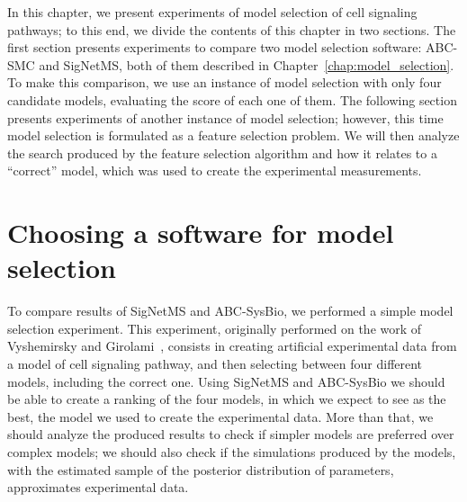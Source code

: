 
In this chapter, we present experiments of model selection of cell
signaling pathways; to this end, we divide the contents of this chapter in two 
sections. The first section presents experiments to compare two model 
selection software: ABC-SMC and SigNetMS, both of them described in 
Chapter~\ref{chap:model_selection}. To make this comparison, we
use an instance of model selection with only four candidate models,
evaluating the score of each one of them. The following section presents
experiments of another instance of model selection; however, this time
model selection is formulated as a feature selection problem. We will then analyze the
search produced by the feature selection algorithm and how it relates to
a ``correct'' model, which was used to create the experimental
measurements.

\section{Choosing a software for model selection}
%
%  

To compare results of SigNetMS and ABC-SysBio, we performed a simple 
model selection experiment. This experiment, originally performed on the 
work of Vyshemirsky and Girolami~\cite{Vyshemirsky2007}, consists in 
creating artificial experimental data from a model of cell signaling 
pathway, and then selecting between four different models, including the
correct one. Using SigNetMS and ABC-SysBio we should be able to create a
ranking of the four models, in which we expect to see as the best, the
model we used to create the experimental data. More than that, we should
analyze the produced results to check if simpler models are preferred 
over complex models; we should also check if the simulations produced by
the models, with the estimated sample of the posterior distribution of
parameters, approximates experimental data.

